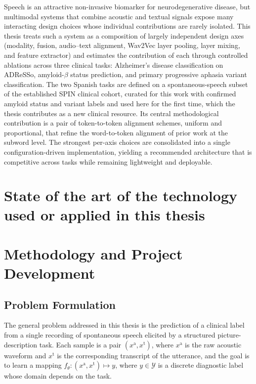 \documentclass[a4paper,12pt]{article}
\begin{document}
Speech is an attractive non-invasive biomarker for neurodegenerative disease, but multimodal systems that combine acoustic and textual signals expose many interacting design choices whose individual contributions are rarely isolated. This thesis treats such a system as a composition of largely independent design axes (modality, fusion, audio--text alignment, Wav2Vec layer pooling, layer mixing, and feature extractor) and estimates the contribution of each through controlled ablations across three clinical tasks: Alzheimer's disease classification on ADReSSo, amyloid-$\beta$ status prediction, and primary progressive aphasia variant classification. The two Spanish tasks are defined on a spontaneous-speech subset of the established SPIN clinical cohort, curated for this work with confirmed amyloid status and variant labels and used here for the first time, which the thesis contributes as a new clinical resource. Its central methodological contribution is a pair of token-to-token alignment schemes, uniform and proportional, that refine the word-to-token alignment of prior work at the subword level. The strongest per-axis choices are consolidated into a single configuration-driven implementation, yielding a recommended architecture that is competitive across tasks while remaining lightweight and deployable.



\clearpage\section{State of the art of the technology used or applied in this thesis}
\label{sec:sota}



\clearpage\section{Methodology and Project Development}
\label{sec:methodology}

\subsection{Problem Formulation}
\label{ssec:problem_formulation}

The general problem addressed in this thesis is the prediction of a clinical label from a single recording of spontaneous speech elicited by a structured picture-description task. Each sample is a pair $(x^{\mathrm{a}}, x^{\mathrm{t}})$, where $x^{\mathrm{a}}$ is the raw acoustic waveform and $x^{\mathrm{t}}$ is the corresponding transcript of the utterance, and the goal is to learn a mapping $f_\theta : (x^{\mathrm{a}}, x^{\mathrm{t}}) \mapsto y$, where $y \in \mathcal{Y}$ is a discrete diagnostic label whose domain depends on the task.
\end{document}
